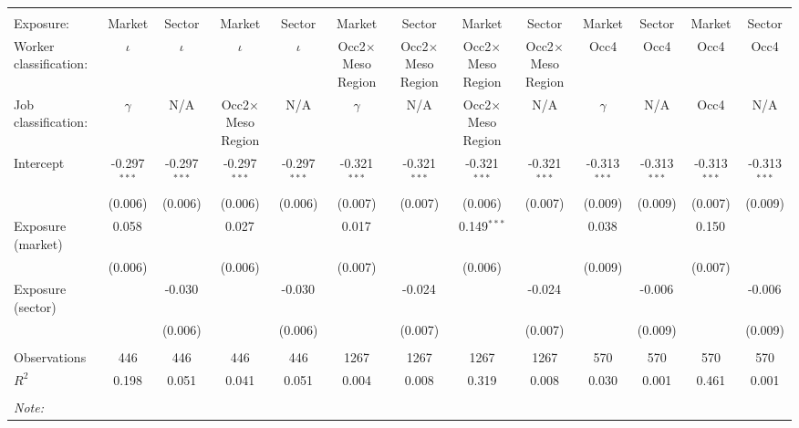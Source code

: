 \begin{tabular}{@{\extracolsep{5pt}}lcccccccccccc}
\\[-1.8ex]\hline
\hline \\[-1.8ex]
\hline \\[-1.8ex]
 Exposure: & Market & Sector & Market & Sector & Market & Sector & Market & Sector & Market & Sector & Market & Sector \\
 Worker classification: & $\iota$ & $\iota$ & $\iota$ & $\iota$ & Occ2$\times$Meso Region & Occ2$\times$Meso Region & Occ2$\times$Meso Region & Occ2$\times$Meso Region & Occ4 & Occ4 & Occ4 & Occ4 \\
 Job classification: & $\gamma$ & N/A & Occ2$\times$Meso Region & N/A & $\gamma$ & N/A & Occ2$\times$Meso Region & N/A & $\gamma$ & N/A & Occ4 & N/A \\
 Intercept & -0.297$^{***}$ & -0.297$^{***}$ & -0.297$^{***}$ & -0.297$^{***}$ & -0.321$^{***}$ & -0.321$^{***}$ & -0.321$^{***}$ & -0.321$^{***}$ & -0.313$^{***}$ & -0.313$^{***}$ & -0.313$^{***}$ & -0.313$^{***}$ \\
& (0.006) & (0.006) & (0.006) & (0.006) & (0.007) & (0.007) & (0.006) & (0.007) & (0.009) & (0.009) & (0.007) & (0.009) \\
 Exposure (market) & 0.058$^{}$ & & 0.027$^{}$ & & 0.017$^{}$ & & 0.149$^{***}$ & & 0.038$^{}$ & & 0.150$^{}$ & \\
& (0.006) & & (0.006) & & (0.007) & & (0.006) & & (0.009) & & (0.007) & \\
 Exposure (sector) & & -0.030$^{}$ & & -0.030$^{}$ & & -0.024$^{}$ & & -0.024$^{}$ & & -0.006$^{}$ & & -0.006$^{}$ \\
& & (0.006) & & (0.006) & & (0.007) & & (0.007) & & (0.009) & & (0.009) \\
\hline \\[-1.8ex]
 Observations & 446 & 446 & 446 & 446 & 1267 & 1267 & 1267 & 1267 & 570 & 570 & 570 & 570 \\
 $R^2$ & 0.198 & 0.051 & 0.041 & 0.051 & 0.004 & 0.008 & 0.319 & 0.008 & 0.030 & 0.001 & 0.461 & 0.001 \\
\hline
\hline \\[-1.8ex]
\textit{Note:}\end{tabular}